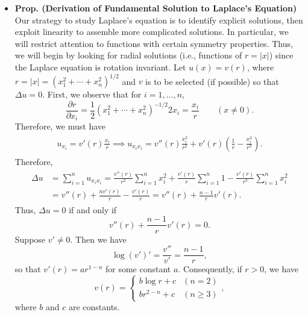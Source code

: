 \documentclass{article}
\begin{document}
\begin{itemize}
		\item \textbf{Prop. (Derivation of Fundamental Solution to Laplace's Equation)} Our strategy to study Laplace's equation is to identify explicit solutions, then exploit linearity to assemble more complicated solutions. In particular, we will restrict attention to functions with certain symmetry properties. Thus, we will begin by looking for radial solutions (i.e., functions of $r = |x|$) since the Laplace equation is rotation invariant.  Let $u(x) = v(r)$, where $r = |x| = (x_{1}^{2} + \dotsm + x_{n}^{2})^{1/2}$ and $v$ is to be selected (if possible) so that $\Delta u = 0$. First, we observe that for $i = 1, \ldots, n$, 
		\begin{equation*}
			\frac{\partial r}{\partial x_{i}} = \frac{1}{2}(x_{1}^{2} + \dotsm + x_{n}^{2})^{-1/2}2x_{i} = \frac{x_{i}}{r} \qquad (x \neq 0). 
		\end{equation*}
		Therefore, we must have 
		\begin{align*}
			\begin{split}
				u_{x_{i}} = v'(r) \frac{x_{i}}{r} \implies u_{x_{i}x_{i}} = v''(r)\frac{x_{i}^{2}}{r^{2}} + v'(r)\left(\frac{1}{r} - \frac{x_{i}^{2}}{r^{3}}\right). 
			\end{split}
		\end{align*}
		Therefore, 
		\begin{align*}
			\begin{split}
				\Delta u &= \sum_{i = 1}^{n}u_{x_{i}x_{i}} = \frac{v''(r)}{r^{2}}\sum_{i = 1}^{n}x_{i}^{2} + \frac{v'(r)}{r}\sum_{i = 1}^{n}1 - \frac{v'(r)}{r^{3}}\sum_{i = 1}^{n}x_{i}^{2} \\
				&= v''(r) + \frac{nv'(r)}{r} - \frac{v'(r)}{r} = v''(r) + \frac{n-1}{r}v'(r). 
			\end{split}
		\end{align*}
		Thus, $\Delta u = 0$ if and only if 
		\begin{equation*}
			v''(r) + \frac{n-1}{r}v'(r) = 0. 
		\end{equation*}
		Suppose $v' \neq 0$. Then we have 
		\begin{equation*}
			\log(v')' = \frac{v''}{v'} = \frac{n - 1}{r}, 
		\end{equation*}
		so that $v'(r) = ar^{1-n}$ for some constant $a$. Consequently, if $r > 0$, we have 
		\begin{equation*}
			v(r) = 
			\begin{cases}
				b\log{r} + c & (n = 2) \\
				br^{2-n} + c & (n \geq 3)
			\end{cases}, 
		\end{equation*}
		where $b$ and $c$ are constants. 
		

\end{itemize}
\end{document}
